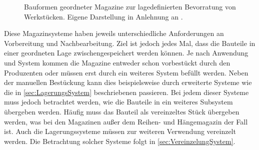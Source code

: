 \begin{figure}[htbp]
\caption[Bauformen geordneter Magazine]{Bauformen geordneter Magazine zur
lagedefinierten Bevorratung von Werkstücken. Eigene Darstellung in Anlehnung
an .}
\label{fig:magazinbauformen}
\end{figure}

Diese Magazinsysteme haben jeweils unterschiedliche Anforderungen an Vorbereitung und Nachbearbeitung. Ziel ist jedoch
jedes Mal, dass die Bauteile in einer geordneten Lage zwischengespeichert werden können. Je nach Anwendung und System
kommen die Magazine entweder schon vorbestückt durch den Produzenten oder müssen erst durch ein weiteres System befüllt
werden. Neben der manuellen Bestückung kann dies beispielsweise durch erweiterte Systeme wie die in \cref{sec:LagerungsSystem}
beschriebenen passieren. Bei jedem dieser Systeme muss jedoch betrachtet werden, wie die Bauteile in ein weiteres Subsystem übergeben
werden. Häufig muss das Bauteil als vereinzeltes Stück übergeben werden, was bei den Magazinen außer dem Reihen- und Hängemagazin
der Fall ist. Auch die Lagerungssysteme müssen zur weiteren Verwendung vereinzelt werden. Die Betrachtung solcher Systeme folgt
in \cref{sec:VereinzelungSystem}.
%
%
